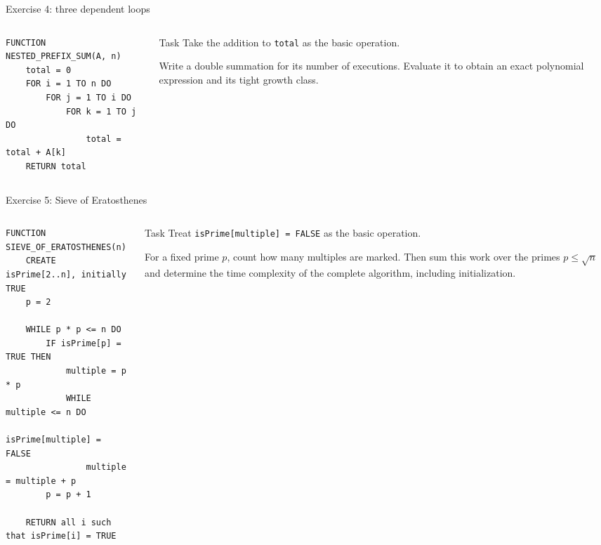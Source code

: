 \documentclass[aspectratio=169]{beamer}
\begin{document}
\begin{frame}[fragile]{Exercise 4: three dependent loops}
  \begin{columns}[T]
    \begin{column}{0.55\textwidth}
\begin{lstlisting}[style=pseudo,basicstyle=\ttfamily\small]
FUNCTION NESTED_PREFIX_SUM(A, n)
    total = 0
    FOR i = 1 TO n DO
        FOR j = 1 TO i DO
            FOR k = 1 TO j DO
                total = total + A[k]
    RETURN total
\end{lstlisting}
    \end{column}
    \begin{column}{0.41\textwidth}
      \begin{block}{Task}
        Take the addition to \texttt{total} as the basic operation.

        Write a double summation for its number of executions. Evaluate it to
        obtain an exact polynomial expression and its tight growth class.
      \end{block}
    \end{column}
  \end{columns}
\end{frame}

\begin{frame}[fragile]{Exercise 5: Sieve of Eratosthenes}
  \scriptsize
  \begin{columns}[T]
    \begin{column}{0.58\textwidth}
\begin{lstlisting}[style=pseudo,basicstyle=\ttfamily\scriptsize]
FUNCTION SIEVE_OF_ERATOSTHENES(n)
    CREATE isPrime[2..n], initially TRUE
    p = 2

    WHILE p * p <= n DO
        IF isPrime[p] = TRUE THEN
            multiple = p * p
            WHILE multiple <= n DO
                isPrime[multiple] = FALSE
                multiple = multiple + p
        p = p + 1

    RETURN all i such that isPrime[i] = TRUE
\end{lstlisting}
    \end{column}
    \begin{column}{0.38\textwidth}
      \begin{block}{Task}
        Treat
        \texttt{isPrime[multiple] = FALSE} as the basic operation.

        For a fixed prime $p$, count how many multiples are marked. Then sum
        this work over the primes $p\le\sqrt n$ and determine the time
        complexity of the complete algorithm, including initialization.
      \end{block}
    \end{column}
  \end{columns}
\end{frame}
\end{document}
